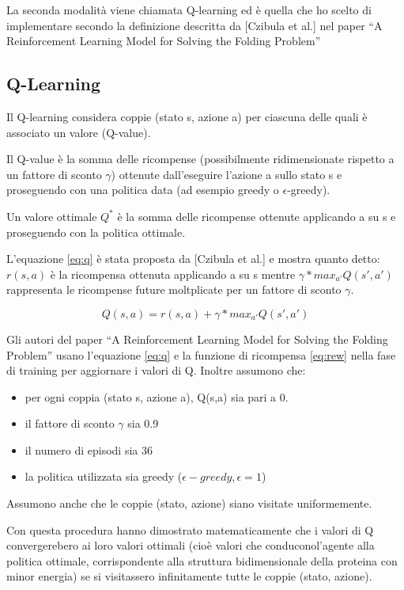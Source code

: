 \documentclass[conference]{IEEEtran}
\begin{document}
La seconda modalità viene chiamata Q-learning ed è quella che ho scelto di implementare secondo la definizione descritta da [Czibula et al.] nel paper ``A Reinforcement Learning Model for Solving the Folding Problem''

\subsection{Q-Learning}

Il Q-learning considera coppie (stato s, azione a) per ciascuna delle quali è associato un valore (Q-value).

Il Q-value è la somma delle ricompense (possibilmente ridimensionate rispetto a un fattore di sconto $\gamma$) ottenute dall'eseguire l'azione a sullo stato s e proseguendo con una politica data (ad esempio greedy o $\epsilon$-greedy).

Un valore ottimale $Q^*$ è la somma delle ricompense ottenute applicando a su s e proseguendo con la politica ottimale.

L'equazione \ref{eq:q} è stata proposta da [Czibula et al.] e mostra quanto detto: $r(s,a)$ è la ricompensa ottenuta applicando a su s mentre $\gamma * max_{a'} Q(s', a')$ rappresenta le ricompense future moltplicate per un fattore di sconto $\gamma$.

\begin{equation}
\label{eq:q}
Q(s,a) = r(s,a) + \gamma * max_{a'} Q(s', a')
\end{equation}

Gli autori del paper ``A Reinforcement Learning Model for Solving the Folding Problem'' usano l'equazione \ref{eq:q} e la funzione di ricompensa \ref{eq:rew} nella fase di training per aggiornare i valori di Q. Inoltre assumono che:

\begin{itemize}
 \item per ogni coppia (stato s, azione a), Q(s,a) sia pari a 0.
 \item il fattore di sconto $\gamma$ sia 0.9
 \item il numero di episodi sia 36
 \item la politica utilizzata sia greedy ($\epsilon-greedy, \epsilon = 1$)
\end{itemize}

Assumono anche che le coppie (stato, azione) siano visitate uniformemente.

Con questa procedura hanno dimostrato matematicamente che i valori di Q convergerebero ai loro valori ottimali (cioè valori che conduconol'agente alla politica ottimale, corrispondente alla struttura bidimensionale della proteina con minor energia) se si visitassero infinitamente tutte le coppie (stato, azione).
\end{document}
